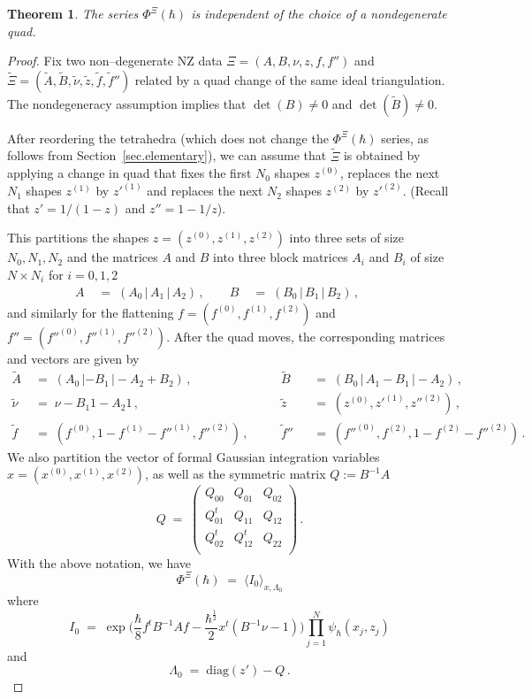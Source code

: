 \documentclass[12pt,reqno]{amsart}
\newtheorem{theorem}{Theorem}[section]
\theoremstyle{definition}
\def\be{\begin{equation}}
\def\ee{\end{equation}}
\def\diag{\mathrm{diag}}
\newcommand{\bea}{\begin{equation}\begin{aligned}}
\newcommand{\eea}{\end{aligned}\end{equation}}
\renewcommand{\=}{\;=\;}
\newcommand{\hsqrt}{\hbar^{\frac{1}{2}}}
\begin{document}
\begin{theorem}
\label{thm.quadinvariance}  
The series $\Phi^{\Xi}(\hbar)$ is independent of the choice of a nondegenerate
quad. 
\end{theorem}

\begin{proof}
Fix two non--degenerate NZ data $\Xi=(A,B,\nu,z,f,f'')$ and 
$\widetilde{\Xi}=(\widetilde{A},\widetilde{B},\widetilde{\nu},\widetilde{z},
\widetilde{f},\widetilde{f}'')$ related by a quad change of the same ideal
triangulation. The nondegeneracy assumption implies that $\det(B) \neq 0$ and 
$\det(\widetilde{B})\neq0$. 

After reordering the tetrahedra (which does not change the $\Phi^\Xi(\hbar)$
series, as follows from Section~\ref{sec.elementary}), we can assume
that $\widetilde{\Xi}$ is obtained by applying a change in quad that fixes
the first $N_0$ shapes $z^{(0)}$, replaces the next $N_1$ shapes $z^{(1)}$
by $z'^{(1)}$ and replaces the next $N_2$ shapes $z^{(2)}$ by $z'^{(2)}$. (Recall
that $z'=1/(1-z)$ and $z''=1-1/z$).

\medskip

This partitions the shapes $z=(z^{(0)},z^{(1)},z^{(2)})$ into three sets of 
size $N_0,N_1,N_2$ and the matrices $A$ and $B$ into three block matrices
$A_i$ and $B_i$ of size $N \times N_i$ for $i=0,1,2$
\bea
A &\= (A_0\,|\,A_1\,|\,A_2)\,,\qquad
B &\= (B_0\,|\,B_1\,|\,B_2)\,,\qquad
\eea
and similarly for the flattening $f=(f^{(0)},f^{(1)},f^{(2)})$ and
$f''=(f''^{(0)},f''^{(1)},f''^{(2)})$. After the quad moves, the corresponding
matrices and vectors are given by
\bea
\tilde A &\= (A_0\,|-B_1\,|-A_2+B_2)\,,\quad
& &\tilde B & &\!\!\!=\; (B_0\,|\,A_1-B_1\,|-A_2)\,,\\
\tilde \nu &\= \nu - B_1  1 - A_2 1\,,\quad
& &\tilde z & &\!\!\!=\; 
(z^{(0)},z'^{(1)},z''^{(2)})\,,\\
\tilde f &\= (f^{(0)},1-f^{(1)}-f''^{(1)},f''^{(2)})\,,\quad
& &\tilde f'' & &\!\!\!=\; 
(f''^{(0)},f^{(2)},1-f^{(2)}-f''^{(2)})\,.
\eea
We also partition the vector of formal Gaussian integration variables
$x=(x^{(0)},x^{(1)},x^{(2)})$, as well as the symmetric matrix $Q:=B^{-1}A$
\be
Q\=
\begin{pmatrix}
Q_{00} & Q_{01} & Q_{02}\\
Q_{01}^t & Q_{11} & Q_{12}\\
Q_{02}^t & Q_{12}^t & Q_{22}\\
\end{pmatrix}\,.
\ee
With the above notation, we have
\be
\Phi^{\Xi}(\hbar) \= \langle I_0 \rangle_{x,\Lambda_0}
\ee
where
\[
I_0 \= \exp\Big(\frac\hbar8 f^t B^{-1} A f
-\frac{\hsqrt}2 x^t(B^{-1}\nu-1)\Big)
\prod_{j=1}^N \psi_{\hbar}(x_j,z_j)
\]
and
\begin{equation*}
\Lambda_0\=\diag(z')-Q \,.
\end{equation*}


\end{proof}
\end{document}
